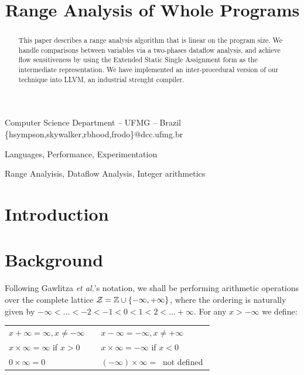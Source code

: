 \documentclass[preprint]{sigplanconf}
\begin{document}
\copyrightdata{[to be supplied]} 


\title{Range Analysis of Whole Programs}
\subtitle{}

           {Computer Science Department -- UFMG -- Brazil}
           {\{hsympson,skywalker,rbhood,frodo\}@dcc.ufmg.br}

\maketitle

\begin{abstract}
This paper describes a range analysis algorithm that is linear on the
program size.
We handle comparisons between variables via a two-phases dataflow analysis, and
achieve flow sensitiveness by using the Extended Static Single Assignment
form as the intermediate representation.
We have implemented an inter-procedural version of our technique into LLVM, an
industrial strenght compiler.
\end{abstract}


\terms
Languages, Performance, Experimentation

\keywords
Range Analyisis, Dataflow Analysis, Integer arithmetics

\section{Introduction}
\label{sec:intro}

\section{Background}
\label{sec:bck}

Following Gawlitza {\em et al.}'s notation, we shall be performing arithmetic
operations over the complete lattice
$\cal{Z} = \mathbb{Z} \cup \{-\infty, +\infty\}$, where the ordering is
naturally given by $-\infty < \ldots < -2 < -1 < 0 < 1 < 2 < \ldots +\infty$.
For any $x > -\infty$ we define:

\begin{tabular}{lcl}
$x + \infty = \infty, x \neq -\infty$ & \mbox{\hspace{0.1cm}} & $x - \infty = - \infty, x \neq +\infty$ \\
$x \times \infty = \infty$ if $x > 0$ & & $x \times \infty = -\infty$ if $x < 0$ \\
$0 \times \infty = 0$ & & $(-\infty) \times \infty = \ $ not defined $$ \\
\end{tabular}
\end{document}
